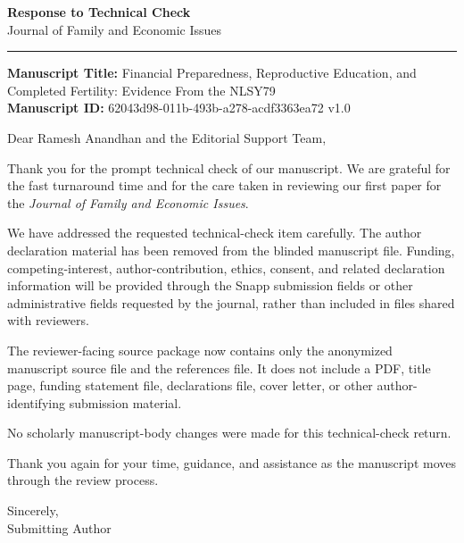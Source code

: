 \documentclass[12pt]{article}
\begin{document}
\begin{center}
{\Large\textbf{Response to Technical Check}}\\[0.6em]
{\normalsize Journal of Family and Economic Issues}\\[1.2em]
\rule{0.82\textwidth}{0.4pt}
\end{center}

\vspace{0.6em}

\textbf{Manuscript Title:} Financial Preparedness, Reproductive Education, and Completed Fertility: Evidence From the NLSY79\\
\textbf{Manuscript ID:} 62043d98-011b-493b-a278-acdf3363ea72 v1.0

\vspace{0.8em}

Dear Ramesh Anandhan and the Editorial Support Team,

Thank you for the prompt technical check of our manuscript. We are grateful for the fast turnaround time and for the care taken in reviewing our first paper for the \textit{Journal of Family and Economic Issues}.

We have addressed the requested technical-check item carefully. The author declaration material has been removed from the blinded manuscript file. Funding, competing-interest, author-contribution, ethics, consent, and related declaration information will be provided through the Snapp submission fields or other administrative fields requested by the journal, rather than included in files shared with reviewers.

The reviewer-facing source package now contains only the anonymized manuscript source file and the references file. It does not include a PDF, title page, funding statement file, declarations file, cover letter, or other author-identifying submission material.

No scholarly manuscript-body changes were made for this technical-check return.

Thank you again for your time, guidance, and assistance as the manuscript moves through the review process.

\vspace{1.2em}

Sincerely,\\[0.6em]
Submitting Author
\end{document}

